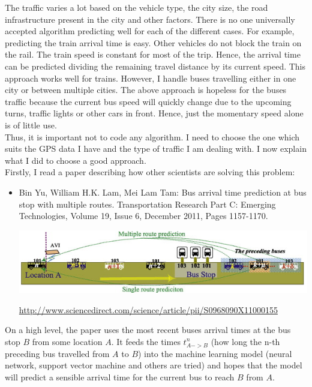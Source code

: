\documentclass[12pt,a4paper,oneside,openright]{report}
\begin{document}
The traffic varies a lot based on the vehicle type, the city size, the road
infrastructure present in the city and other factors. There is no one universally
accepted algorithm predicting well for each of the different cases. For example, predicting
the train arrival time is easy. Other vehicles do not block the train on the rail. The train
speed is constant for most of the trip. Hence, the arrival time can be predicted dividing the
remaining travel distance by its current speed. This approach works well for trains. However,
I handle buses travelling either in one city or between multiple cities. The above
approach is hopeless for the buses traffic because the current bus speed will quickly
change due to the upcoming turns, traffic lights or other cars in front. Hence, just the
momentary speed alone is of little use. \\

Thus, it is important not to code any algorithm. I need to choose the one which suits the GPS data
I have and the type of traffic I am dealing with. I now explain what I did to choose a good approach. \\

Firstly, I read a paper describing how other scientists are solving this problem:

\begin{itemize}

\item Bin Yu, William H.K. Lam, Mei Lam Tam: Bus arrival time prediction at
bus stop with multiple routes. Transportation Research Part C: Emerging Technologies,
Volume 19, Issue 6, December 2011, Pages 1157-1170.

\includegraphics[width=\textwidth]{figs/paper.png}

\textcolor{blue}{\url{http://www.sciencedirect.com/science/article/pii/S0968090X11000155}}

\end{itemize}

On a high level, the paper uses the most recent buses arrival times at the bus stop $B$
from some location $A$. It feeds the times $t^{n}_{A->B}$ (how long the n-th
preceding bus travelled from $A$ to $B$) into the machine learning model (neural network,
support vector machine and others are tried) and hopes that the model will predict a
sensible arrival time for the current bus to reach $B$ from $A$. \\
\end{document}
